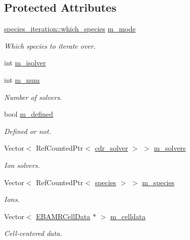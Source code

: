 \subsection*{Protected Attributes}
\begin{DoxyCompactItemize}
\item 
\hyperlink{namespacespecies__iteration_a3384cfe7d9c1a8fa3dbc0c75efc8fb7e}{species\+\_\+iteration\+::which\+\_\+species} \hyperlink{classcdr__iterator_a22a13dbd5020936b417c7db7f597b5e4}{m\+\_\+mode}
\begin{DoxyCompactList}\small\item\em Which species to iterate over. \end{DoxyCompactList}\item 
int \hyperlink{classcdr__iterator_a3719b8b718d18a0abfd9ef402a61ab63}{m\+\_\+isolver}
\item 
int \hyperlink{classcdr__iterator_a466179360a4416fb7507f54fd72e3282}{m\+\_\+num}
\begin{DoxyCompactList}\small\item\em Number of solvers. \end{DoxyCompactList}\item 
bool \hyperlink{classcdr__iterator_ae1109228ca97e56c0a2a3416b684d459}{m\+\_\+defined}
\begin{DoxyCompactList}\small\item\em Defined or not. \end{DoxyCompactList}\item 
Vector$<$ Ref\+Counted\+Ptr$<$ \hyperlink{classcdr__solver}{cdr\+\_\+solver} $>$ $>$ \hyperlink{classcdr__iterator_aa57b85ee374ede25d1fc1b0134e83fd0}{m\+\_\+solvers}
\begin{DoxyCompactList}\small\item\em Ion solvers. \end{DoxyCompactList}\item 
Vector$<$ Ref\+Counted\+Ptr$<$ \hyperlink{classspecies}{species} $>$ $>$ \hyperlink{classcdr__iterator_ad6674dc863a6cb6c7060e78d10aba336}{m\+\_\+species}
\begin{DoxyCompactList}\small\item\em Ions. \end{DoxyCompactList}\item 
Vector$<$ \hyperlink{type__definitions_8H_a7e610f301989e5e07781c5e338bdb7c3}{E\+B\+A\+M\+R\+Cell\+Data} $\ast$ $>$ \hyperlink{classcdr__iterator_ac7eba9325ad85fcecf9f47a7721cc9d7}{m\+\_\+celldata}
\begin{DoxyCompactList}\small\item\em Cell-\/centered data. \end{DoxyCompactList}\end{DoxyCompactItemize}


